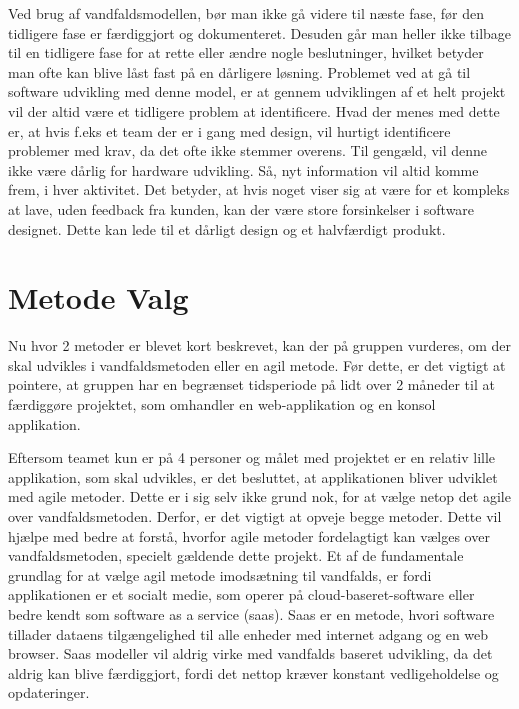 Ved brug af vandfaldsmodellen, bør man ikke gå videre til næste fase, før den tidligere fase er færdiggjort og dokumenteret. Desuden går man heller ikke tilbage til en tidligere fase for at rette eller ændre nogle beslutninger, hvilket betyder man ofte kan blive låst fast på en dårligere løsning. Problemet ved at gå til software udvikling med denne model, er at gennem udviklingen af et helt projekt vil der altid være et tidligere problem at identificere. Hvad der menes med dette er, at hvis f.eks et team der er i gang med design, vil hurtigt identificere problemer med krav, da det ofte ikke stemmer overens. Til gengæld, vil denne ikke være dårlig for hardware udvikling. Så, nyt information vil altid komme frem, i hver aktivitet. Det betyder, at hvis noget viser sig at være for et kompleks at lave, uden feedback fra kunden, kan der være store forsinkelser i software designet. Dette kan lede til et dårligt design og et halvfærdigt produkt. \cite{Sommerville}

\section{Metode Valg}

Nu hvor 2 metoder er blevet kort beskrevet, kan der på gruppen vurderes, om der skal udvikles i vandfaldsmetoden eller en agil metode. Før dette, er det vigtigt at pointere, at gruppen har en begrænset tidsperiode på lidt over 2 måneder til at færdiggøre projektet, som omhandler en web-applikation og en konsol applikation.

Eftersom teamet kun er på 4 personer og målet med projektet er en relativ lille applikation, som skal udvikles, er det besluttet, at applikationen bliver udviklet med agile metoder. Dette er i sig selv ikke grund nok, for at vælge netop det agile over vandfaldsmetoden. Derfor, er det vigtigt at opveje begge metoder. Dette vil hjælpe med bedre at forstå, hvorfor agile metoder fordelagtigt kan vælges over vandfaldsmetoden, specielt gældende dette projekt. Et af de fundamentale grundlag for at vælge agil metode imodsætning til vandfalds, er fordi applikationen er et socialt medie, som operer på cloud-baseret-software eller bedre kendt som software as a service (saas). Saas er en metode, hvori software tillader dataens tilgængelighed til alle enheder med internet adgang og en web browser.\cite{SoftwareAdvice} Saas modeller vil aldrig virke med vandfalds baseret udvikling, da det aldrig kan blive færdiggjort, fordi det nettop kræver konstant vedligeholdelse og opdateringer.

